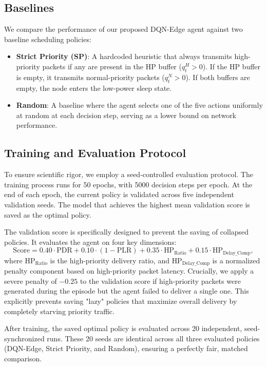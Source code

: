 \documentclass[runningheads,a4paper]{llncs}
\begin{document}
\subsection{Baselines}
We compare the performance of our proposed DQN-Edge agent against two baseline scheduling policies:
\begin{itemize}
    \item \textbf{Strict Priority (SP)}: A hardcoded heuristic that always transmits high-priority packets if any are present in the HP buffer ($q_t^{H} > 0$). If the HP buffer is empty, it transmits normal-priority packets ($q_t^{N} > 0$). If both buffers are empty, the node enters the low-power sleep state.
    \item \textbf{Random}: A baseline where the agent selects one of the five actions uniformly at random at each decision step, serving as a lower bound on network performance.
\end{itemize}

\subsection{Training and Evaluation Protocol}
To ensure scientific rigor, we employ a seed-controlled evaluation protocol. The training process runs for 50 epochs, with 5000 decision steps per epoch. At the end of each epoch, the current policy is validated across five independent validation seeds. The model that achieves the highest mean validation score is saved as the optimal policy.

The validation score is specifically designed to prevent the saving of collapsed policies. It evaluates the agent on four key dimensions:
\begin{equation}
\text{Score} = 0.40 \cdot \text{PDR} + 0.10 \cdot (1 - \text{PLR}) + 0.35 \cdot \text{HP}_{\text{Ratio}} + 0.15 \cdot \text{HP}_{\text{Delay\_Comp}},
\end{equation}
where $\text{HP}_{\text{Ratio}}$ is the high-priority delivery ratio, and $\text{HP}_{\text{Delay\_Comp}}$ is a normalized penalty component based on high-priority packet latency. Crucially, we apply a severe penalty of $-0.25$ to the validation score if high-priority packets were generated during the episode but the agent failed to deliver a single one. This explicitly prevents saving "lazy" policies that maximize overall delivery by completely starving priority traffic.

After training, the saved optimal policy is evaluated across 20 independent, seed-synchronized runs. These 20 seeds are identical across all three evaluated policies (DQN-Edge, Strict Priority, and Random), ensuring a perfectly fair, matched comparison.
\end{document}
